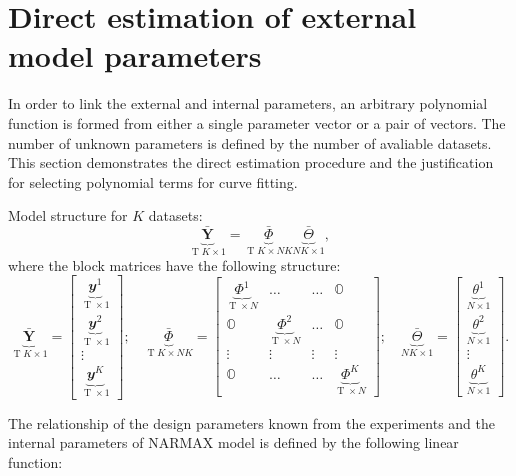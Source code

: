 \documentclass[a4paper,11pt,twoside]{article}
\DeclareMathOperator{\zeros}{\mathbb{O}}
\DeclareMathOperator{\T}{\mathrm{T}}
\theoremstyle{mytheoremstyle}
\begin{document}
\section{Direct estimation of external model parameters}
\par In order to link the external and internal parameters, an arbitrary polynomial function is formed from either a single parameter vector or a pair of vectors. The number of unknown parameters is defined by the number of avaliable datasets. This section demonstrates the direct estimation procedure and the justification for selecting polynomial terms for curve fitting.
\par Model structure for $K$ datasets:
\begin{equation}\label{eq:batchtimeser}
\underbrace{\bar{\mathbf{Y}}}_{\T K\times 1} = \underbrace{\bar{\Phi}}_{\T K \times NK} \underbrace{\bar{\Theta}}_{NK \times 1},
\end{equation}
where the block matrices have the following structure:
\begin{equation}
\underbrace{\bar{\mathbf{Y}}}_{\T K\times 1} = \left[\begin{array}{c} 
\underbrace{\mathbfit{y}^1}_{\T\times 1} \\
\underbrace{\mathbfit{y}^2}_{\T\times 1} \\
\vdots \\
\underbrace{\mathbfit{y}^K}_{\T\times 1}
\end{array}\right]; \quad 
\underbrace{\bar{\Phi}}_{\T K \times NK} = \left[\begin{array}{cccc} 
\underbrace{\Phi^1}_{\T \times N} & \dots & \dots & \zeros \\
\zeros & \underbrace{\Phi^2}_{\T \times N} & \dots & \zeros \\
\vdots & \vdots & \vdots & \vdots  \\
\zeros & \dots & \dots & \underbrace{\Phi^K}_{\T \times N}
\end{array}\right]; \quad 
\underbrace{\bar{\Theta}}_{NK \times 1} = \left[\begin{array}{c} 
\underbrace{\theta^1}_{N \times 1} \\
\underbrace{\theta^2}_{N \times 1} \\
\vdots \\
\underbrace{\theta^K}_{N \times 1}
\end{array}\right].
\end{equation}
\par The relationship of the design parameters known from the experiments and the internal parameters of NARMAX model  is defined by the following linear function:
\end{document}
